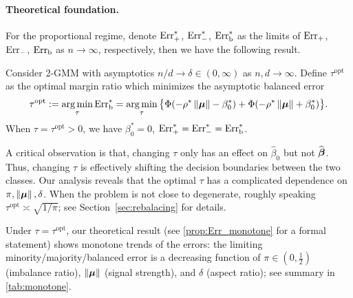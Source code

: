 \paragraph{Theoretical foundation.} For the proportional regime, denote $\mathrm{Err}_+^*$, $\mathrm{Err}_-^*$, $\mathrm{Err}_\mathrm{b}^*$ as the limits of $\mathrm{Err}_+$, $\mathrm{Err}_-$, $\mathrm{Err}_\mathrm{b}$ as $n \to \infty$, respectively, then we have the following result.
\begin{prop}\label{prop:tau_opt}
    Consider 2-GMM with asymptotics $n/d \to \delta \in (0,\infty)$ as $n, d \to \infty$.
    Define $\tau^\mathrm{opt}$
    as the optimal margin ratio which minimizes the asymptotic balanced error
\begin{equation*}
    \tau^\mathrm{opt} :=  \operatorname*{arg\,min}_{\tau} \mathrm{Err}_\mathrm{b}^* = \operatorname*{arg\,min}_{\tau} \big\{ \Phi(- \rho^*\left\|{\text{\boldmath $\mu$}}\right\| - \beta_0^* )
    + \Phi(- \rho^*\left\|{\text{\boldmath $\mu$}}\right\| + \beta_0^* ) \big\}.
\end{equation*}
When $\tau = \tau^\mathrm{opt}>0$, we have $\beta_0^* = 0$, $\mathrm{Err}_+^* = \mathrm{Err}_-^* = \mathrm{Err}_\mathrm{b}^*$. 
\end{prop}
A critical observation is that, changing $\tau$ only has an effect on $\hat \beta_0$ but not $\widehat {{\boldsymbol{\beta}}}$. Thus, changing $\tau$ is effectively shifting the decision boundaries between the two classes. Our analysis reveals that the optimal $\tau$ has a complicated dependence on $\pi, \left\|{{\boldsymbol{\mu}}}\right\|, \delta$. When the problem is not close to degenerate, roughly speaking $\tau^\mathrm{opt} \asymp \sqrt{1/\pi}$; see Section~\ref{sec:rebalacing} for details. 


Under $\tau = \tau^\mathrm{opt}$, our theoretical result (see \cref{prop:Err_monotone} for a formal statement) shows monotone trends of the errors: the limiting minority/majority/balanced error is a decreasing function of $\pi \in (0, \frac12)$ (imbalance ratio), $\left\|{\text{\boldmath $\mu$}}\right\|$ (signal strength), and $\delta$ (aspect ratio); see summary in \cref{tab:monotone}.


